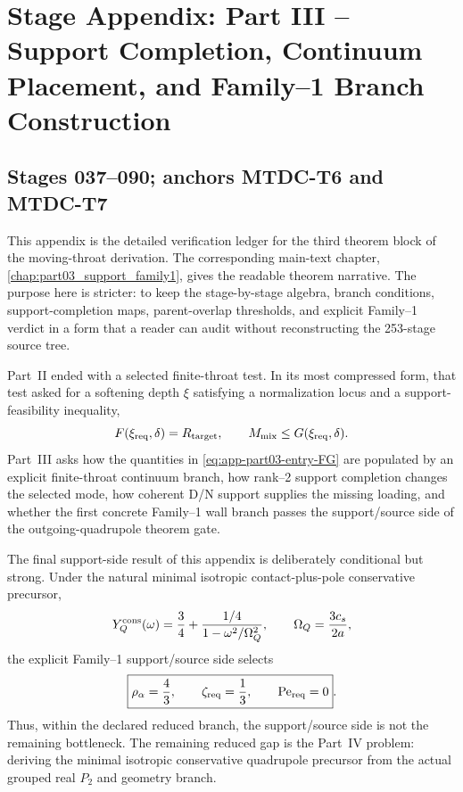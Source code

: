 \chapter{Stage Appendix: Part III -- Support Completion, Continuum Placement, and Family--1 Branch Construction}
\label{app:stage-part-3}

\section*{Stages 037--090; anchors MTDC-T6 and MTDC-T7}

This appendix is the detailed verification ledger for the third theorem block of the moving-throat derivation.  The corresponding main-text chapter, \cref{chap:part03_support_family1}, gives the readable theorem narrative.  The purpose here is stricter: to keep the stage-by-stage algebra, branch conditions, support-completion maps, parent-overlap thresholds, and explicit Family--1 verdict in a form that a reader can audit without reconstructing the 253-stage source tree.

Part~II ended with a selected finite-throat test.  In its most compressed form, that test asked for a softening depth \(\xi\) satisfying a normalization locus and a support-feasibility inequality,
\begin{equation}
\label{eq:app-part03-entry-FG}
F(\xi_{\rm req},\delta)=R_{\rm target},
\qquad
M_{\rm mix}\leq G(\xi_{\rm req},\delta).
\end{equation}
Part~III asks how the quantities in \eqref{eq:app-part03-entry-FG} are populated by an explicit finite-throat continuum branch, how rank--2 support completion changes the selected mode, how coherent D/N support supplies the missing loading, and whether the first concrete Family--1 wall branch passes the support/source side of the outgoing-quadrupole theorem gate.

The final support-side result of this appendix is deliberately conditional but strong.  Under the natural minimal isotropic contact-plus-pole conservative precursor,
\begin{equation}
\label{eq:app-part03-minimal-module-preview}
Y_Q^{\rm cons}(\omega)
=\frac34+\frac{1/4}{1-\omega^2/\Omega_Q^2},
\qquad
\Omega_Q=\frac{3c_s}{2a},
\end{equation}
the explicit Family--1 support/source side selects
\begin{equation}
\label{eq:app-part03-final-ratio-preview}
\boxed{
\rho_\alpha=\frac43,
\qquad
\zeta_{\rm req}=\frac13,
\qquad
\mathrm{Pe}_{\rm req}=0}.
\end{equation}
Thus, within the declared reduced branch, the support/source side is not the remaining bottleneck.  The remaining reduced gap is the Part~IV problem: deriving the minimal isotropic conservative quadrupole precursor from the actual grouped real \(P_2\) and geometry branch.


